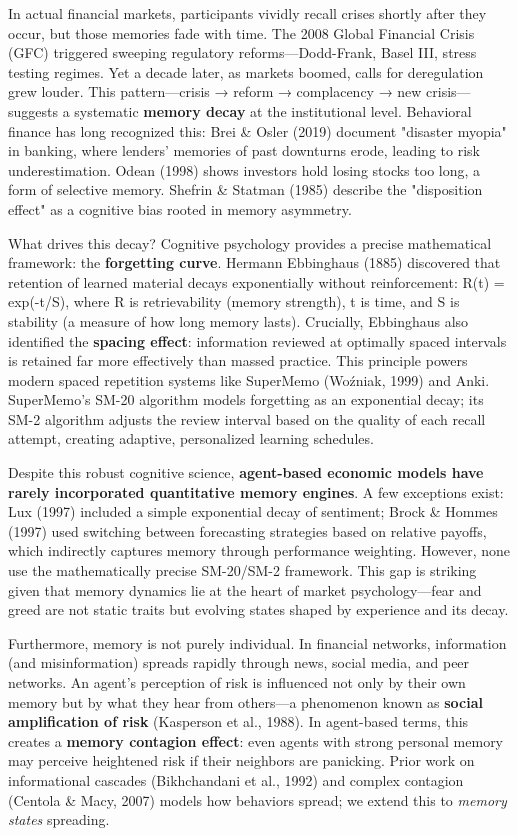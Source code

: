 \documentclass[11pt]{article}
\begin{document}
In actual financial markets, participants vividly recall crises shortly after they occur, but those memories fade with time. The 2008 Global Financial Crisis (GFC) triggered sweeping regulatory reforms—Dodd-Frank, Basel III, stress testing regimes. Yet a decade later, as markets boomed, calls for deregulation grew louder. This pattern—crisis → reform → complacency → new crisis—suggests a systematic \textbf{memory decay} at the institutional level. Behavioral finance has long recognized this: Brei \& Osler (2019) document "disaster myopia" in banking, where lenders' memories of past downturns erode, leading to risk underestimation. Odean (1998) shows investors hold losing stocks too long, a form of selective memory. Shefrin \& Statman (1985) describe the "disposition effect" as a cognitive bias rooted in memory asymmetry.

What drives this decay? Cognitive psychology provides a precise mathematical framework: the \textbf{forgetting curve}. Hermann Ebbinghaus (1885) discovered that retention of learned material decays exponentially without reinforcement: R(t) = exp(-t/S), where R is retrievability (memory strength), t is time, and S is stability (a measure of how long memory lasts). Crucially, Ebbinghaus also identified the \textbf{spacing effect}: information reviewed at optimally spaced intervals is retained far more effectively than massed practice. This principle powers modern spaced repetition systems like SuperMemo (Woźniak, 1999) and Anki. SuperMemo's SM-20 algorithm models forgetting as an exponential decay; its SM-2 algorithm adjusts the review interval based on the quality of each recall attempt, creating adaptive, personalized learning schedules.

Despite this robust cognitive science, \textbf{agent-based economic models have rarely incorporated quantitative memory engines}. A few exceptions exist: Lux (1997) included a simple exponential decay of sentiment; Brock \& Hommes (1997) used switching between forecasting strategies based on relative payoffs, which indirectly captures memory through performance weighting. However, none use the mathematically precise SM-20/SM-2 framework. This gap is striking given that memory dynamics lie at the heart of market psychology—fear and greed are not static traits but evolving states shaped by experience and its decay.

Furthermore, memory is not purely individual. In financial networks, information (and misinformation) spreads rapidly through news, social media, and peer networks. An agent's perception of risk is influenced not only by their own memory but by what they hear from others—a phenomenon known as \textbf{social amplification of risk} (Kasperson et al., 1988). In agent-based terms, this creates a \textbf{memory contagion effect}: even agents with strong personal memory may perceive heightened risk if their neighbors are panicking. Prior work on informational cascades (Bikhchandani et al., 1992) and complex contagion (Centola \& Macy, 2007) models how behaviors spread; we extend this to \textit{memory states} spreading.
\end{document}
